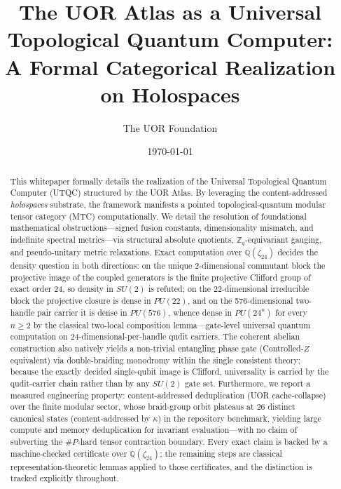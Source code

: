 \documentclass[aps,pra,preprint,superscriptaddress,11pt,floatfix]{revtex4-2} %
\theoremstyle{definition}
\begin{document}
\title{The UOR Atlas as a Universal Topological Quantum Computer:\texorpdfstring{\\}{ } A Formal Categorical Realization on Holospaces}

\author{The UOR Foundation}
\date{\today}

\begin{abstract}
This whitepaper formally details the realization of the Universal Topological Quantum Computer (UTQC) structured by the UOR Atlas. By leveraging the content-addressed \textit{holospaces} substrate, the framework manifests a pointed topological-quantum modular tensor category (MTC) computationally. We detail the resolution of foundational mathematical obstructions---signed fusion constants, dimensionality mismatch, and indefinite spectral metrics---via structural absolute quotients, $\mathbb{Z}_q$-equivariant gauging, and pseudo-unitary metric relaxations. Exact computation over $\mathbb{Q}(\zeta_{24})$ decides the density question in both directions: on the unique 2-dimensional commutant block the projective image of the coupled generators is the finite projective Clifford group of exact order 24, so density in $SU(2)$ is refuted; on the 22-dimensional irreducible block the projective closure is dense in $PU(22)$, and on the 576-dimensional two-handle pair carrier it is dense in $PU(576)$, whence dense in $PU(24^{n})$ for every $n \ge 2$ by the classical two-local composition lemma---gate-level universal quantum computation on 24-dimensional-per-handle qudit carriers. The coherent abelian construction also natively yields a non-trivial entangling phase gate (Controlled-$Z$ equivalent) via double-braiding monodromy within the single consistent theory; because the exactly decided single-qubit image is Clifford, universality is carried by the qudit-carrier chain rather than by any $SU(2)$ gate set. Furthermore, we report a measured engineering property: content-addressed deduplication (UOR cache-collapse) over the finite modular sector, whose braid-group orbit plateaus at 26 distinct canonical states (content-addressed by $\kappa$) in the repository benchmark, yielding large compute and memory deduplication for invariant evaluation---with no claim of subverting the $\#P$-hard tensor contraction boundary. Every exact claim is backed by a machine-checked certificate over $\mathbb{Q}(\zeta_{24})$; the remaining steps are classical representation-theoretic lemmas applied to those certificates, and the distinction is tracked explicitly throughout.
\end{abstract}

\maketitle










\end{document}
